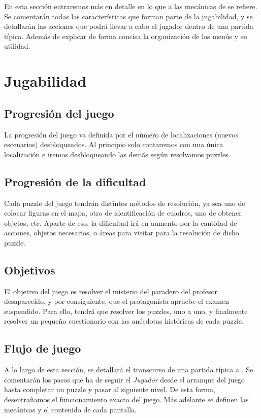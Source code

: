 En esta sección entraremos más en detalle en lo que a las mecánicas de \nombrejuego se refiere. Se comentarán todas las características que forman parte de la jugabilidad, y se detallarán las acciones que podrá llevar a cabo el jugador dentro de una partida típica. Además de explicar de forma concisa la organización de los menús y su utilidad.

    \section{Jugabilidad}
        \subsection{Progresión del juego}
        La progresión del juego va definida por el número de localizaciones (nuevos escenarios) desbloqueados. Al principio solo contaremos con una única localización e iremos desbloqueando las demás según resolvamos puzzles.
        
        \subsection{Progresión de la dificultad}%
        Cada puzzle del juego tendrán distintos métodos de resolución, ya sea uno de colocar figuras en el mapa, otro de identificación de cuadros, uno de obtener objetos, etc. Aparte de eso, la dificultad irá en aumento por la cantidad de acciones, objetos necesarios, o áreas para visitar para la resolución de dicho puzzle.
        
        \subsection{Objetivos}
        El objetivo del juego es resolver el misterio del paradero del profesor desaparecido, y por consiguiente, que el protagonista apruebe el examen suspendido. Para ello, tendrá que resolver los puzzles, uno a uno, y finalmente resolver un pequeño cuestionario con las anécdotas históricas de cada puzzle.
        
        \subsection{Flujo de juego}%
        A lo largo de esta sección, se detallará el transcurso de una partida típica a \nombrejuego. Se comentarán los pasos que ha de seguir el \emph{Jugador} desde el arranque del juego hasta completar un puzzle y pasar al siguiente nivel. De esta forma, desentrañamos el funcionamiento exacto del juego. Más adelante se definen las mecánicas y el contenido de cada pantalla.
        

